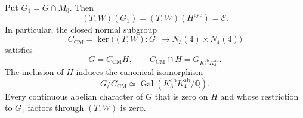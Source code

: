 \begin{theorem}\label{thm:adelic-frame-elimination}
Put $G_1=G\cap M_0$.  Then
\begin{equation}
 (T,W)(G_1)=(T,W)(H^{\mathrm{cyc}})=\mathcal E.
 \label{eq:adelic-gt-arithmetic-image}
\end{equation}
In particular, the closed normal subgroup
\begin{equation}
 C_{\mathrm{CM}}=
 \ker\bigl((T,W):G_1\longrightarrow N_3(4)\times N_4(4)\bigr)
 \label{eq:adelic-cm-kernel}
\end{equation}
satisfies
\begin{equation}
 G=C_{\mathrm{CM}}H,\qquad
 C_{\mathrm{CM}}\cap H=
 G_{K_3^{\mathrm{ab}}K_4^{\mathrm{ab}}}.
 \label{eq:adelic-cm-normalization}
\end{equation}
The inclusion of $H$ induces the canonical isomorphism
\begin{equation}
 G/C_{\mathrm{CM}}\simeq
 \operatorname{Gal}(K_3^{\mathrm{ab}}K_4^{\mathrm{ab}}/\mathbb Q).
 \label{eq:adelic-cm-arithmetic-quotient}
\end{equation}
Every continuous abelian character of $G$ that is zero on $H$
and whose restriction to $G_1$ factors through $(T,W)$ is zero.
\end{theorem}

